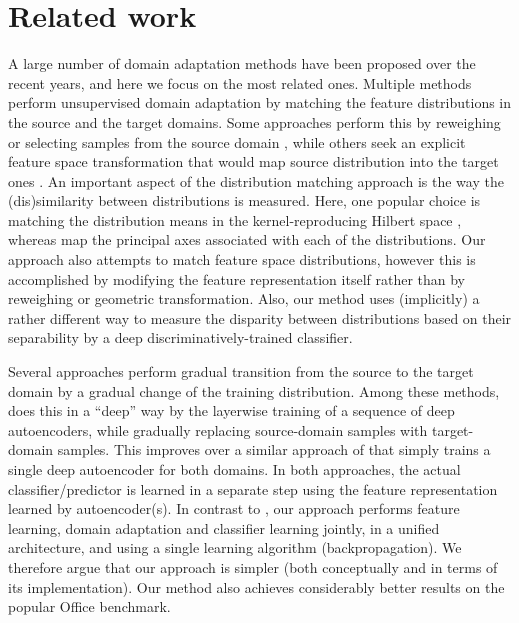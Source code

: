 \section{Related work}
\label{sec:related}

A large number of domain adaptation methods have been proposed over the recent years, and here we focus on the most related ones. Multiple methods perform unsupervised domain adaptation by matching the feature distributions in the source and the target domains. Some approaches perform this by reweighing or selecting samples from the source domain \cite{Borgwardt06,Huang06,Gong13}, while others seek an explicit feature space transformation that would map source distribution into the target ones \cite{Pan11,Gopalan11,Baktashmotlagh13}. An important aspect of the distribution matching approach is the way the (dis)similarity between distributions is measured.  Here, one popular choice is matching the distribution means in the kernel-reproducing Hilbert space \cite{Borgwardt06,Huang06}, whereas \cite{Gong12,Fernando13} map the principal axes associated with each of the distributions. Our approach also attempts to match feature space distributions, however this is accomplished by modifying the feature representation itself rather than by reweighing or geometric transformation. Also, our method uses (implicitly) a rather different way to measure the disparity between distributions based on their separability by a deep discriminatively-trained classifier.

Several approaches perform gradual transition from the source to the target domain \cite{Gopalan11,Gong12} by a gradual change of the training distribution. Among these methods, \cite{Chopra13} does this in a ``deep'' way by the layerwise training of a sequence of deep autoencoders, while gradually replacing source-domain samples with target-domain samples. This improves over a similar approach of \cite{Glorot11} that simply trains a single deep autoencoder for both domains. In both approaches, the actual classifier/predictor is learned in a separate step using the feature representation learned by autoencoder(s). In contrast to \cite{Glorot11,Chopra13}, our approach performs feature learning, domain adaptation and classifier learning jointly, in a unified architecture, and using a single learning algorithm (backpropagation). We therefore argue that our approach is simpler (both conceptually and in terms of its implementation). Our method also achieves considerably better results on the popular {\sc Office} benchmark.

